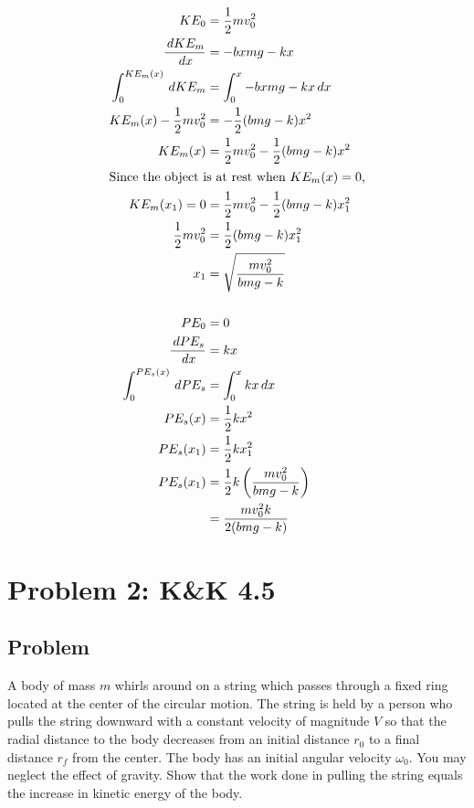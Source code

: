 \documentclass[solutions]{esg8012pset}
\renewcommand{\d}{\,d}
\begin{document}
\begin{align*}
  KE_0 & = \frac{1}{2}m v_0^2 \\
  \frac{\d KE_m}{\d x} & = -bx m g - kx \\
  \int_0^{KE_m(x)} \d{KE_m} & = \int_0^x {-bx m g - kx}\d x \\
  KE_m(x) - \frac{1}{2}m v_0^2 & = -\frac{1}{2}(b m g - k)x^2 \\
  KE_m(x) & = \frac{1}{2}m v_0^2 - \frac{1}{2}(b m g - k)x^2 \\
  \intertext{Since the object is at rest when $KE_m(x) = 0$,}
  KE_m(x_1) = 0 & = \frac{1}{2}m v_0^2 - \frac{1}{2}(b m g - k)x_1^2 \\
  \frac{1}{2}m v_0^2 & = \frac{1}{2}(b m g - k)x_1^2 \\
  x_1 & = \sqrt{\frac{m v_0^2}{b m g - k}} \\
  \\
  PE_0 & = 0 \\
  \frac{\d PE_s}{\d x} & = k x \\
  \int_0^{PE_s(x)} \d{PE_s} & = \int_0^x k x \d x \\
  PE_s(x) & = \frac{1}{2}k x^2 \\
  PE_s(x_1) & = \frac{1}{2}k x_1^2 \\
  PE_s(x_1) & = \frac{1}{2} k \left(\frac{m v_0^2}{b m g - k}\right) \\
   & = \frac{m v_0^2 k}{2(b m g - k)}
\end{align*}
\section*{Problem 2: K\&K 4.5}
\subsection*{Problem}
  A body of mass $m$ whirls around on a string which passes through a fixed ring located at the center of the circular motion. The string is held by a person who pulls the string downward with a constant velocity of magnitude $V$ so that the radial distance to the body decreases from an initial distance $r_0$ to a final distance $r_f$ from the center. The body has an initial angular velocity $\omega_0$. You may neglect the effect of gravity. Show that the work done in pulling the string equals the increase in kinetic energy of the body.
\end{document}
